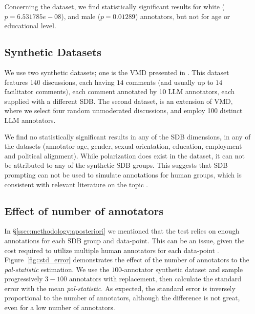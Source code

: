 \documentclass{article}
\begin{document}
Concerning the \textcite{sap-etal-2022-annotators} dataset, we find statistically significant results for white ($p = 6.531785e-08$), and male ($p=0.01289$) annotators, but not for age or educational level.


\subsection{Synthetic Datasets}

We use two synthetic datasets; one is the \ac{VMD} presented in \textcite{tsirmpas2025scalableevaluationonlinefacilitation}. This dataset features $140$ discussions, each having $14$ comments (and usually up to $14$ facilitator comments), each comment annotated by 10 \ac{LLM} annotators, each supplied with a different \ac{SDB}. The second dataset, is an extension of \ac{VMD}, where we select four random unmoderated discussions, and employ 100 distinct \ac{LLM} annotators.

We find no statistically significant results in any of the \ac{SDB} dimensions, in any of the datasets (annotator age, gender, sexual orientation, education, employment and political alignment). While polarization does exist in the dataset, %
it can not be attributed to any of the synthetic \ac{SDB} groups. This suggests that \ac{SDB} prompting can not be used to simulate annotations for human groups, which is consistent with relevant literature on the topic \parencite{anthis_2025,hewitt2024predicting,rossi_2024,jansen_2023,bisbee_2023,neumann_2025}.


\subsection{Effect of number of annotators}
\label{ssec: results:num_annotators}

In \S\ref{ssec:methodology:aposteriori} we mentioned that the test relies on enough annotations for each \ac{SDB} group and data-point. This can be an issue, given the cost required to utilize multiple human annotators for each data-point \parencite{rossi_2024}. Figure~\ref{fig::std_error} demonstrates the effect of the number of annotators to the \textit{pol-statistic} estimation. We use the $100$-annotator synthetic dataset and sample progressively $3-100$ annotators with replacement, then calculate the standard error with the mean \textit{pol-statistic}. As expected, the standard error is inversely proportional to the number of annotators, although the difference is not great, even for a low number of annotators.
\end{document}
